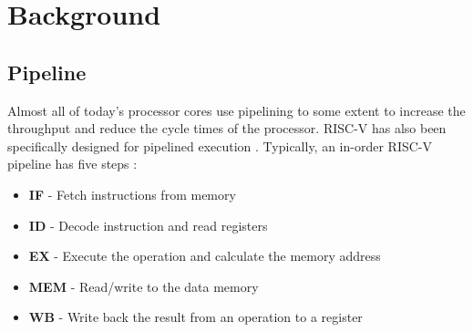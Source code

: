 \chapter{Background}
\label{ch:Background} 

%
%
%

%
%


\section{Pipeline}
\label{sec:bg_pipeline}

Almost all of today's processor cores use pipelining to some extent to increase the throughput and reduce the cycle times of the processor. RISC-V has also been specifically designed for pipelined execution \cite{pattersonComputerOrganizationDesign2021}. 
Typically, an in-order RISC-V pipeline has five steps \cite{pattersonComputerOrganizationDesign2021}:

\begin{itemize}
    \item \textbf{IF} - Fetch instructions from memory
    \item \textbf{ID} - Decode instruction and read registers
    \item \textbf{EX} - Execute the operation and calculate the memory address
    \item \textbf{MEM} - Read/write to the data memory
    \item \textbf{WB} - Write back the result from an operation to a register
\end{itemize}

